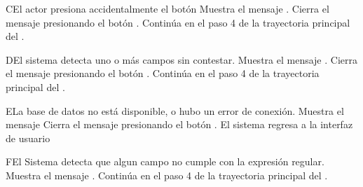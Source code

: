 \begin{UCtrayectoriaA}{C}{El actor presiona accidentalmente el botón }
	\UCpaso Muestra el mensaje .
	\UCpaso[\UCactor] Cierra el mensaje presionando el botón .
	\UCpaso Continúa en el paso 4 de la trayectoria principal del .
\end{UCtrayectoriaA}
\begin{UCtrayectoriaA}{D}{El sistema detecta uno o más campos sin contestar.}
	\UCpaso Muestra el mensaje .
	\UCpaso[\UCactor] Cierra el mensaje presionando el botón .
	\UCpaso Continúa en el paso 4 de la trayectoria principal del .
\end{UCtrayectoriaA}
\begin{UCtrayectoriaA}{E}{La base de datos no está disponible, o hubo un error de conexión.}
	\UCpaso Muestra el mensaje 
	\UCpaso[\UCactor] Cierra el mensaje presionando el botón .
	\UCpaso El sistema regresa a la interfaz de usuario 
\end{UCtrayectoriaA}
\begin{UCtrayectoriaA}{F}{El Sistema detecta que algun campo no cumple con la expresión regular.}
	\UCpaso Muestra el mensaje .
	\UCpaso Continúa en el paso 4 de la trayectoria principal del .
\end{UCtrayectoriaA}